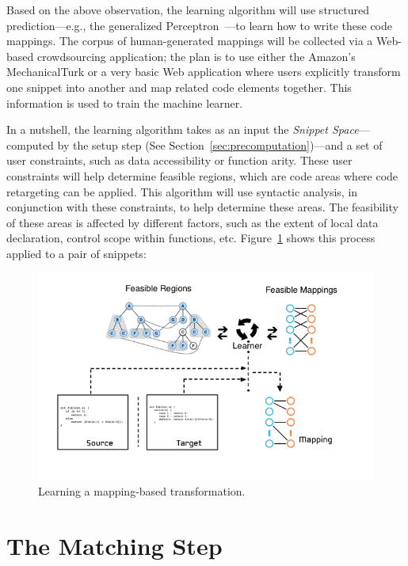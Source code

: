 Based on the above observation, the learning algorithm will use structured prediction---e.g., the generalized Perceptron~\cite{Collins:2002uo}---to learn how to write these code mappings. The corpus of human-generated mappings will be collected via a Web-based crowdsourcing application; the plan is to use either the Amazon's MechanicalTurk or a very basic Web application where users explicitly transform one snippet into another and map related code elements together. This information is used to train the machine learner.

In a nutshell, the learning algorithm takes as an input the \emph{Snippet Space}---computed by the setup step (See Section~\ref{sec:precomputation})---and a set of user constraints, such as data accessibility or function arity. These user constraints will help determine feasible regions, which are code areas where code retargeting can be applied. This algorithm will use syntactic analysis, in conjunction with these constraints, to help determine these areas. The feasibility of these areas is affected by different factors, such as the extent of local data declaration, control scope within functions, etc. Figure~\ref{fig:mappinggeneration} shows this process applied to a pair of snippets:

\begin{figure}[!ht]
    \centering
    \includegraphics[width=\textwidth]{images/mappinggeneration}
    \caption{Learning a mapping-based transformation.}
    \label{fig:mappinggeneration}
\end{figure}

\section{The Matching Step}
\label{sec:matching}

